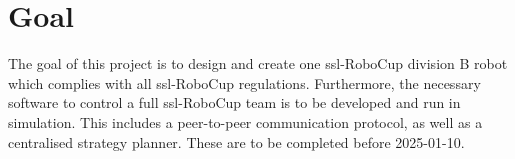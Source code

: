 \section{Goal}
\label{section:goal}

The goal of this project is to design and create one \ac{ssl}-RoboCup division B robot which complies with all \ac{ssl}-RoboCup regulations. Furthermore, the necessary software to control a full \ac{ssl}-RoboCup team is to be developed and run in simulation. This includes a peer-to-peer communication protocol, as well as a centralised strategy planner. These are to be completed before 2025-01-10.

